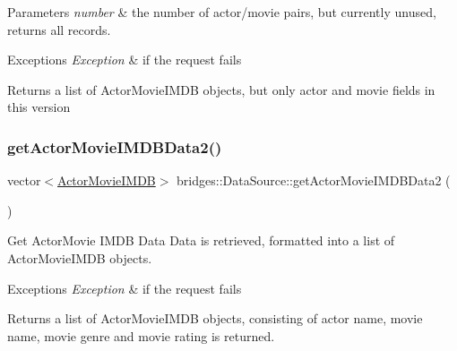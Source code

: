 \begin{DoxyParams}{Parameters}
{\em number} & the number of actor/movie pairs, but currently unused, returns all records. \\
\hline
\end{DoxyParams}

\begin{DoxyExceptions}{Exceptions}
{\em Exception} & if the request fails\\
\hline
\end{DoxyExceptions}
\begin{DoxyReturn}{Returns}
a list of Actor\+Movie\+I\+M\+DB objects, but only actor and movie fields in this version 
\end{DoxyReturn}
\mbox{\label{classbridges_1_1_data_source_a00f0a0a1871d4864c6ccdd04195e0fb2}} 
\subsubsection{\texorpdfstring{get\+Actor\+Movie\+I\+M\+D\+B\+Data2()}{getActorMovieIMDBData2()}}
{\footnotesize\ttfamily vector$<$\hyperlink{classbridges_1_1dataset_1_1_actor_movie_i_m_d_b}{Actor\+Movie\+I\+M\+DB}$>$ bridges\+::\+Data\+Source\+::get\+Actor\+Movie\+I\+M\+D\+B\+Data2 (\begin{DoxyParamCaption}{ }\end{DoxyParamCaption})\hspace{0.3cm}{\ttfamily [inline]}}



Get Actor\+Movie I\+M\+DB Data Data is retrieved, formatted into a list of Actor\+Movie\+I\+M\+DB objects. 


\begin{DoxyExceptions}{Exceptions}
{\em Exception} & if the request fails\\
\hline
\end{DoxyExceptions}
\begin{DoxyReturn}{Returns}
a list of Actor\+Movie\+I\+M\+DB objects, consisting of actor name, movie name, movie genre and movie rating is returned. 
\end{DoxyReturn}
\mbox{\label{classbridges_1_1_data_source_acdd904b0aea30e34738aa8d5fa0efba5}} 

